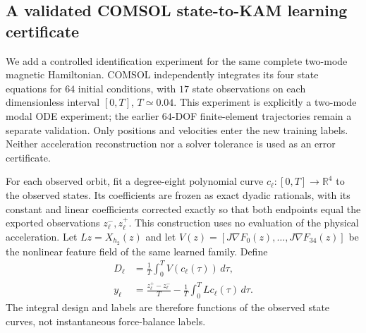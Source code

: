 \subsection{A validated COMSOL state-to-KAM learning certificate}
\label{sec:validated-integral-learning}

We add a controlled identification experiment for the same complete
two-mode magnetic Hamiltonian. COMSOL independently integrates its four
state equations for $64$ initial conditions, with $17$ state observations
on each dimensionless interval $[0,T]$, $T\simeq0.04$.
This experiment is explicitly a two-mode modal ODE experiment; the
earlier $64$-DOF finite-element trajectories remain a separate validation.
Only positions and velocities enter the new training labels.
Neither acceleration reconstruction nor a solver tolerance is used as
an error certificate.

For each observed orbit, fit a degree-eight polynomial curve
$c_\ell:[0,T]\to\mathbb R^4$ to the observed states.
Its coefficients are frozen as exact dyadic rationals, with its constant
and linear coefficients corrected exactly so that both endpoints equal
the exported observations $z_\ell^-,z_\ell^+$.
This construction uses no evaluation of the physical acceleration.
Let $Lz=X_{h_2}(z)$ and let
$V(z)=[J\nabla F_0(z),\ldots,J\nabla F_{34}(z)]$
be the nonlinear feature field of the same learned family. Define
\begin{equation}
 \begin{aligned}
 D_\ell&=\frac1T\int_0^T V(c_\ell(\tau))\,d\tau,\\
 y_\ell&=\frac{z_\ell^+-z_\ell^-}{T}
          -\frac1T\int_0^T Lc_\ell(\tau)\,d\tau .
 \end{aligned}
 \label{eq:validated-integral-observations}
\end{equation}
The integral design and labels are therefore functions of the observed
state curves, not instantaneous force-balance labels.

